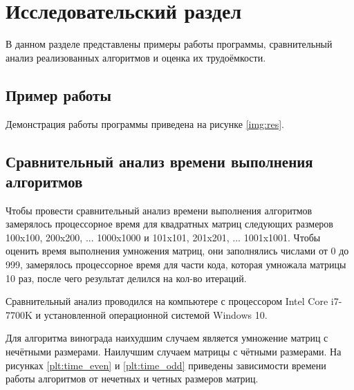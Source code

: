 \chapter{Исследовательский раздел}
В данном разделе представлены примеры работы программы, сравнительный анализ реализованных алгоритмов и оценка их трудоёмкости.

\section{Пример работы}

Демонстрация работы программы приведена на рисунке \ref{img:res}.


\section{Сравнительный анализ времени выполнения алгоритмов}
Чтобы провести сравнительный анализ времени выполнения алгоритмов замерялось процессорное время для квадратных матриц следующих размеров 100x100, 200x200, ... 1000x1000 и 101x101, 201x201, ... 1001x1001. Чтобы оценить время выполнения умножения матриц, они заполнялись числами от 0 до 999, замерялось процессорное время для части кода, которая умножала матрицы 10 раз, после чего результат делился на кол-во итераций.

Сравнительный анализ проводился на компьютере с процессором Intel Core i7-7700K и установленной операционной системой Windows 10.

Для алгоритма винограда наихудшим случаем является умножение матриц с нечётными размерами. Наилучшим случаем матрицы с чётными размерами. На рисунках \ref{plt:time_even} и \ref{plt:time_odd} приведены зависимости времени работы алгоритмов от нечетных и четных размеров матриц.

